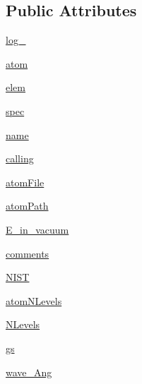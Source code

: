 \subsection*{Public Attributes}
\begin{DoxyCompactItemize}
\item 
\hyperlink{classpyneb_1_1core_1_1pynebcore_1_1___atom_data_ascii_afd87151907f32bc0dc45f0171b61374e}{log\+\_\+}
\item 
\hyperlink{classpyneb_1_1core_1_1pynebcore_1_1___atom_data_ascii_a0c5c7091b1d8a95d9bee2744d713f5c9}{atom}
\item 
\hyperlink{classpyneb_1_1core_1_1pynebcore_1_1___atom_data_ascii_a62e73dc66c7aff7941c5ce94e808c23a}{elem}
\item 
\hyperlink{classpyneb_1_1core_1_1pynebcore_1_1___atom_data_ascii_adaf1b66faf18504ec4b5c8c0b7f6763b}{spec}
\item 
\hyperlink{classpyneb_1_1core_1_1pynebcore_1_1___atom_data_ascii_ab74e6bf80237ddc4109968cedc58c151}{name}
\item 
\hyperlink{classpyneb_1_1core_1_1pynebcore_1_1___atom_data_ascii_ab25fa7ebe84b603684dee62410c1e34c}{calling}
\item 
\hyperlink{classpyneb_1_1core_1_1pynebcore_1_1___atom_data_ascii_afa3c4660b3bcf1e2c199413048b9209e}{atom\+File}
\item 
\hyperlink{classpyneb_1_1core_1_1pynebcore_1_1___atom_data_ascii_a18178a28ecf0c7f251d0974c2097b214}{atom\+Path}
\item 
\hyperlink{classpyneb_1_1core_1_1pynebcore_1_1___atom_data_ascii_a9ebe0987aa5ded08c781ed3b5feb4d8a}{E\+\_\+in\+\_\+vacuum}
\item 
\hyperlink{classpyneb_1_1core_1_1pynebcore_1_1___atom_data_ascii_a64b8b36116751d566275b722e40bb3a7}{comments}
\item 
\hyperlink{classpyneb_1_1core_1_1pynebcore_1_1___atom_data_ascii_a6d03226c81aa049b486e97a3462a794b}{N\+I\+S\+T}
\item 
\hyperlink{classpyneb_1_1core_1_1pynebcore_1_1___atom_data_ascii_ae9ca7d9b8e6463826cd148ff606cbc1c}{atom\+N\+Levels}
\item 
\hyperlink{classpyneb_1_1core_1_1pynebcore_1_1___atom_data_ascii_a4d45fe163c2108853ab418386bf4da56}{N\+Levels}
\item 
\hyperlink{classpyneb_1_1core_1_1pynebcore_1_1___atom_data_ascii_a7cdd347489383ef85cb3526af2a7a0aa}{gs}
\item 
\hyperlink{classpyneb_1_1core_1_1pynebcore_1_1___atom_data_ascii_ab5130f33e76a12670614a4ecf47211b0}{wave\+\_\+\+Ang}
\end{DoxyCompactItemize}


